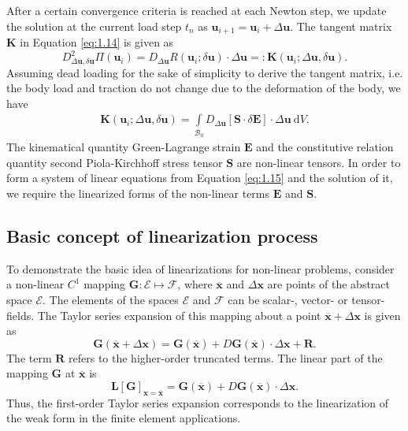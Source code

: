 \documentclass[11pt,a4paper,final]{article}
\begin{document}
After a certain convergence criteria is reached at each Newton step, we update the solution at the current load step $t_n$ as $\mathbf{u}_{i+1} = \mathbf{u}_i + \Delta \mathbf{u}$. The tangent matrix $\mathbf{K}$ in Equation \eqref{eq:1.14} is given as 
\begin{equation}
D^2_{\Delta\mathbf{u}, \delta\mathbf{u}} \Pi(\mathbf{u}_{i}) = D_{\Delta\mathbf{u}} R(\mathbf{u}_i; \delta \mathbf{u}) \cdot \Delta\mathbf{u} =: \mathbf{K}(\mathbf{u}_i; \Delta\mathbf{u}, \delta \mathbf{u}).
\end{equation}
Assuming dead loading for the sake of simplicity to derive the tangent matrix, i.e. the body load and traction do not change due to the deformation of the body, we have
\begin{align}
\mathbf{K}(\mathbf{u}_i; \Delta\mathbf{u}, \delta \mathbf{u}) = \int\limits_{\mathcal{B}_0} D_{\Delta\mathbf{u}} \left[ \mathbf{S} \cdot \delta \mathbf{E} \right] \cdot \Delta\mathbf{u} \ \mathrm{d}V.
\label{eq:1.15}
\end{align}
The kinematical quantity Green-Lagrange strain $\mathbf{E}$ and the constitutive relation quantity second Piola-Kirchhoff stress tensor $\mathbf{S}$ are non-linear tensors. In order to form a system of linear equations from Equation \eqref{eq:1.15} and the solution of it, we require the linearized forms of the non-linear terms $\mathbf{E}$ and $\mathbf{S}$.
\subsection{\textbf{Basic concept of linearization process}}
To demonstrate the basic idea of linearizations for non-linear problems, consider a non-linear $C^1$ mapping $\mathbf{G}: \mathcal{E} \mapsto \mathcal{F}$, where $\overline{\mathbf{x}}$ and $\Delta\mathbf{x}$ are points of the abstract space $\mathcal{E}$. The elements of the spaces $\mathcal{E}$ and $\mathcal{F}$ can be scalar-, vector- or tensor-fields. The Taylor series expansion of this mapping about a point $\overline{\mathbf{x}} + \Delta\mathbf{x}$ is given as
\begin{equation}
\mathbf{G}(\overline{\mathbf{x}} + \Delta\mathbf{x}) = \mathbf{G}(\overline{\mathbf{x}}) + D \mathbf{G}(\overline{\mathbf{x}}) \cdot \Delta\mathbf{x} + \mathbf{R}.
\end{equation}
The term $\mathbf{R}$ refers to the higher-order truncated terms. The linear part of the mapping $\mathbf{G}$ at $\overline{\mathbf{x}}$ is 
\begin{equation}
\mathbf{L} \left[ \mathbf{G} \right]_{\mathbf{x} = \overline{\mathbf{x}}} = \mathbf{G}(\overline{\mathbf{x}}) + D \mathbf{G}(\overline{\mathbf{x}}) \cdot \Delta\mathbf{x}.
\end{equation} 
Thus, the first-order Taylor series expansion corresponds to the linearization of the weak form in the finite element applications. 
\end{document}
